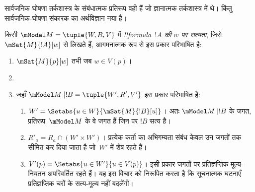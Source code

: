 \documentclass[../../../include/open-logic-section]{subfiles}
\begin{document}


सार्वजनिक घोषणा तर्कशास्त्र के संबंधात्मक प्रतिरूप वही हैं जो ज्ञानात्मक
तर्कशास्त्र में थे। किंतु सार्वजनिक-घोषणा संकारक का अर्थविज्ञान नया है।

\begin{defn} किसी
  $\mModel M = \tuple{W, R, V}$ में \emph{!!{formula}~$!A$ की $w$ पर
  सत्यता}, जिसे $\mSat{M}{!A}[w]$ से लिखते हैं, आगमनात्मक रूप से इस प्रकार
  परिभाषित है:
  \begin{enumerate}
  \item $\mSat{M}{p}[w]$ तभी जब $w \in V(p)$।
  \item{}
  \item{}

  
  जहाँ $\mModel M \mid !B = \tuple{W', R', V'}$ इस प्रकार परिभाषित है:
  \begin{enumerate}
    \item $W' = \Setabs{u \in W}{\mSat{M}{!B}[u]}$। अतः
      $\mModel M \mid !B$ के जगत, प्रतिरूप~$\mModel M$ के वे जगत हैं जिन
      पर $!B$ सत्य है।
    \item $R'_a = R_a \cap (W' \times W')$। प्रत्येक कर्ता का अभिगम्यता
      संबंध केवल उन जगतों तक सीमित कर दिया जाता है जो~$W'$ में शेष रहते हैं।
    \item $V'(p) = \Setabs{u \in W'}{u \in V(p)}$। इसी प्रकार जगतों पर
      प्रतिज्ञप्तिक मूल्य-नियतन अपरिवर्तित रहते हैं। यह इस विचार को निरूपित
      करता है कि सूचनात्मक घटनाएँ प्रतिज्ञप्तिक चरों के सत्य-मूल्य नहीं बदलेंगी।
  \end{enumerate}
  
  \end{enumerate} 
\end{defn}
\end{document}

